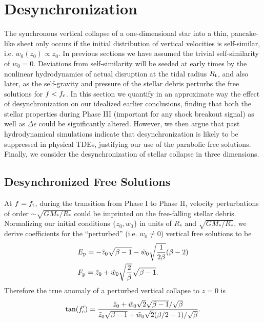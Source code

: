 \documentclass[useAMS, twocolumn, usenatbib]{mn2e}
\begin{document}
\section{Desynchronization}

The synchronous vertical collapse of a one-dimensional star into a thin, pancake-like sheet only occurs if the initial distribution of vertical velocities is self-similar, i.e. $w_0(z_0)\propto z_0$.  In previous sections we have assumed the trivial self-similarity of $w_0=0$.  Deviations from self-similarity will be seeded at early times by the nonlinear hydrodynamics of actual disruption at the tidal radius $R_{\rm t}$, and also later, as the self-gravity and pressure of the stellar debris perturbs the free solutions for $f<f_{\rm c}$.  In this section we quantify in an approximate way the effect of desynchronization on our idealized earlier conclusions, finding that both the stellar properties during Phase III (important for any shock breakout signal) as well as $\Delta \epsilon$ could be significantly altered.  However, we then argue that past hydrodynamical simulations indicate that desynchronization is likely to be suppressed in physical TDEs, justifying our use of the parabolic free solutions.  Finally, we consider the desynchronization of stellar collapse in three dimensions.

\subsection{Desynchronized Free Solutions}

At $f=f_{\rm t}$, during the transition from Phase I to Phase II, velocity perturbations of order $\sim \sqrt{GM_*/R_*}$ could be imprinted on the free-falling stellar debris.  Normalizing our initial conditions $\{z_0, w_0\}$ in units of $R_*$ and $\sqrt{GM_*/R_*}$, we derive coefficients for the ``perturbed'' (i.e. $w_0 \ne 0$) vertical free solutions to be 
\begin{align}
&E_{\rm p}=-\tilde{z}_0 \sqrt{\beta-1}- \tilde{w}_0\sqrt{\frac{1}{2\beta}}(\beta-2) \\
&F_{\rm p}=\tilde{z}_0+\tilde{w}_0\sqrt{\frac{2}{\beta}}\sqrt{\beta-1}. 
\end{align}
Therefore the true anomaly of a perturbed vertical collapse to $z=0$ is 
\begin{equation}
\tan(f_{\rm c}^\prime)=\frac{\tilde{z}_0+\tilde{w}_0\sqrt{2}\sqrt{\beta-1}/\sqrt{\beta}}{\tilde{z}_0\sqrt{\beta-1}+\tilde{w}_0\sqrt{2}(\beta/2-1)/\sqrt{\beta}}. \label{fcprime}
\end{equation}
\end{document}
